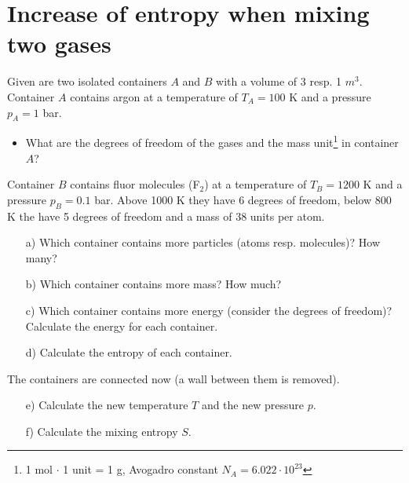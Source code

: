 \documentclass[12pt,a4paper]{article} %
\begin{document}
 
 
 \vspace{1cm}
 
 
 

 \section{Increase of entropy when mixing two gases}
 Given are two isolated containers $A$ and $B$ with a volume of 3 resp. 1 $m^3$. \\ 
 Container $A$ contains argon at a temperature of $T_A = 100$ K and a pressure $p_A = 1$ bar. 
 \begin{itemize}
  \item What are the degrees of freedom of the gases and the mass unit\footnote{ 1 mol $\cdot$ 1 unit = 1 g, Avogadro constant $N_A= 6.022 \cdot 10^{23}$} in container $A$? %
 \end{itemize}
Container $B$ contains fluor molecules (F$_2$) at a temperature of $T_B = 1200$ K and a pressure $p_B = 0.1$ bar. Above 1000 K they have 6 degrees of freedom, below 800 K the have 5 degrees of freedom and a mass of 38 units per atom.
 \begin{itemize}
  \item[a)] Which container contains more particles (atoms resp. molecules)? How many?
  \item[b)] Which container contains more mass? How much?
  \item[c)] Which container contains more energy (consider the degrees of freedom)?
  Calculate the energy for each container.
  \item[d)] Calculate the entropy of each container.
 \end{itemize}
The containers are connected now (a wall between them is removed).
 \begin{itemize}
  \item[e)] Calculate the new temperature $T$ and the new pressure $p$.
  \item[f)] Calculate the mixing entropy $S$.
 \end{itemize}
 
\end{document}
